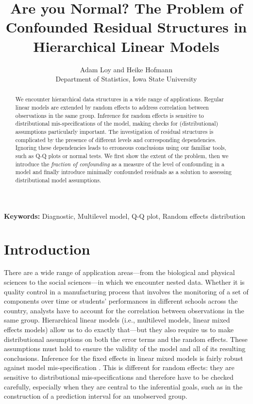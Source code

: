 \documentclass[12pt]{article} %
\title{Are you Normal? The Problem of Confounded Residual Structures in Hierarchical Linear Models}
\author{
	Adam Loy and Heike Hofmann\\
	Department of Statistics,
	Iowa State University
}
\newcommand{\al}[1]{{\color{red} #1}}
\begin{document}
\maketitle


\begin{abstract}
We encounter hierarchical data structures in a wide range of applications. Regular linear models are extended by random effects to address correlation between observations in the same group. Inference for random effects is sensitive to  distributional mis-specifications of the model, making checks for (distributional) assumptions particularly important.  The investigation of residual structures is complicated by the presence of  different levels and corresponding  dependencies. Ignoring these dependencies leads to  erroneous conclusions using our familiar tools, such as Q-Q plots or normal tests. We first show the extent of the problem, then we introduce the {\it fraction of confounding} as a measure of the level of confounding in a model and finally introduce minimally confounded residuals as a solution to assessing distributional model assumptions.
\end{abstract}
{\bf Keywords:} Diagnostic, Multilevel model, Q-Q plot, Random effects distribution


\section{Introduction}\label{sec:intro}
There are a wide range of application areas---from the biological and physical sciences to the social sciences---in which we encounter nested  data.
Whether it is quality control in a manufacturing process that involves the monitoring of a set of components over  time  or students' performances in different schools across the country, analysts have to account for  the correlation between observations in the same group.  Hierarchical linear models \al{(i.e., multilevel models, linear mixed effects models)} allow us to do exactly that---but they also require us to make distributional assumptions on both the error terms and the random effects. These assumptions must hold to ensure the validity of the model and all of its resulting conclusions. 
Inference for the fixed effects in linear mixed models is fairly robust against model mis-specification \citep{Butler:1992tx, Verbeke:1997tf}. This is different for random effects: they are sensitive to  distributional mis-specifications and  therefore have to be checked carefully, especially when they are central to the inferential goals, such as in the construction of a prediction interval for an unobserved group.
\end{document}
